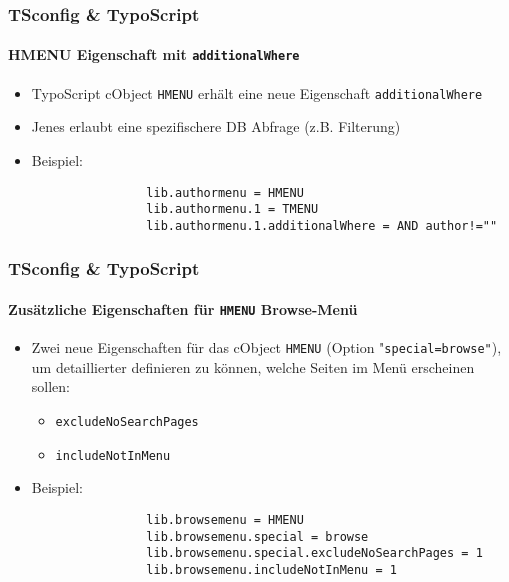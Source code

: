 \begin{frame}[fragile]
	\frametitle{TSconfig \& TypoScript}
	\framesubtitle{HMENU Eigenschaft mit \texttt{additionalWhere}}

	\begin{itemize}

		\item TypoScript cObject \texttt{HMENU} erhält eine neue Eigenschaft \texttt{additionalWhere}
		\item Jenes erlaubt eine spezifischere DB Abfrage (z.B. Filterung)

		\item Beispiel:

			\begin{lstlisting}
				lib.authormenu = HMENU
				lib.authormenu.1 = TMENU
				lib.authormenu.1.additionalWhere = AND author!=""
			\end{lstlisting}

	\end{itemize}

\end{frame}


\begin{frame}[fragile]
	\frametitle{TSconfig \& TypoScript}
	\framesubtitle{Zusätzliche Eigenschaften für \texttt{HMENU} Browse-Menü}

	\begin{itemize}
		\item Zwei neue Eigenschaften für das cObject \texttt{HMENU} (Option
			"\texttt{special=browse"}), um detaillierter definieren zu können,
			welche Seiten im Menü erscheinen sollen:

			\begin{itemize}
				\item \texttt{excludeNoSearchPages}
				\item \texttt{includeNotInMenu}
			\end{itemize}

		\item Beispiel:

			\begin{lstlisting}
				lib.browsemenu = HMENU
				lib.browsemenu.special = browse
				lib.browsemenu.special.excludeNoSearchPages = 1
				lib.browsemenu.includeNotInMenu = 1
			\end{lstlisting}

	\end{itemize}

\end{frame}

